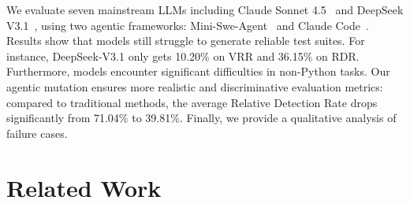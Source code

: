\documentclass[11pt]{article}
\begin{document}
We evaluate seven mainstream LLMs including Claude Sonnet 4.5~\citep{anthropic2025claude} and DeepSeek V3.1~\citep{deepseek2025v31}, using two agentic frameworks: Mini-Swe-Agent~\citep{yang2024sweagent} and Claude Code~\citep{anthropic2025claude}. Results show that models still struggle to generate reliable test suites. For instance, DeepSeek-V3.1 only gets 10.20\% on VRR and 36.15\% on RDR. Furthermore, models encounter significant difficulties in non-Python tasks. Our agentic mutation ensures more realistic and discriminative evaluation metrics: compared to traditional methods, the average Relative Detection Rate drops significantly from 71.04\% to 39.81\%. Finally, we provide a qualitative analysis of failure cases.



\section{Related Work}
\end{document}
